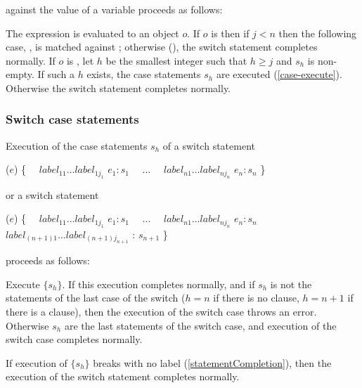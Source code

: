 \documentclass[makeidx]{article}
\begin{document}
\noindent
against the value of a variable \id{} proceeds as follows:

\LMHash{}%
The expression  is evaluated to an object $o$.
If $o$ is \FALSE{} then if $j < n$ then the following case,
, is matched against \id;
otherwise (),
the switch statement completes normally.
If $o$ is \TRUE, let $h$ be the smallest integer
such that $h \ge j$ and $s_h$ is non-empty.
If such a $h$ exists, the case statements $s_h$ are executed
(\ref{case-execute}).
Otherwise the switch statement completes normally.


\subsubsection{Switch case statements}

\LMHash{}%
Execution of the case statements $s_h$ of a switch statement

\begin{normativeDartCode}
\SWITCH{} ($e$) \{
\ \ $label_{11} \ldots label_{1j_1}$ \CASE{} $e_1: s_1$
\ \ $\ldots$
\ \ $label_{n1} \ldots label_{nj_n}$ \CASE{} $e_n: s_n$
\}
\end{normativeDartCode}

or a switch statement

\begin{normativeDartCode}
\SWITCH{} ($e$) \{
\ \ $label_{11} \ldots label_{1j_1}$ \CASE{} $e_1: s_1$
\ \ $\ldots$
\ \ $label_{n1} \ldots label_{nj_n}$ \CASE{} $e_n: s_n$
\ \ $label_{(n+1)1} \ldots label_{(n+1)j_{n+1}}$ \DEFAULT{}: $s_{n+1}$
\}
\end{normativeDartCode}

proceeds as follows:

\LMHash{}%
Execute $\{s_h\}$.
If this execution completes normally,
and if $s_h$ is not the statements of the last case of the switch
($h = n$ if there is no \DEFAULT{} clause,
$h = n+1$ if there is a \DEFAULT{} clause),
then the execution of the switch case throws an error.
Otherwise $s_h$ are the last statements of the switch case,
and execution of the switch case completes normally.


If execution of $\{s_h\}$ breaks with no label (\ref{statementCompletion}),
then the execution of the switch statement completes normally.
\end{document}
